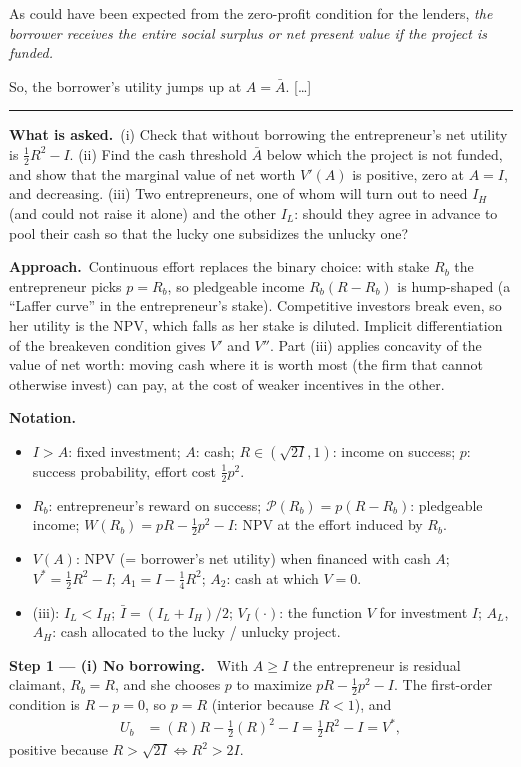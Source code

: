 \documentclass[11pt,a4paper]{article}
\newcommand{\notation}{\par\noindent\textbf{Notation.}}
\newcommand{\step}[2]{\par\medskip\noindent\textbf{Step #1 --- #2.}~}
\newcommand{\asked}{\par\medskip\noindent\textbf{What is asked.}~}
\newcommand{\approach}{\par\smallskip\noindent\textbf{Approach.}~}
\newcommand{\stmtend}{\par\endgroup\nopagebreak\noindent\rule{\linewidth}{0.4pt}\par\medskip}
\begin{document}
As could have been expected from the zero-profit condition for the lenders, \emph{the borrower
receives the entire social surplus or net present value if the project is funded.}

So, the borrower's utility jumps up at \(A = \bar A\). {[}\ldots{]}
\stmtend

\asked (i) Check that without borrowing the entrepreneur's net utility is $\tfrac12R^2-I$. (ii)
Find the cash threshold $\bar A$ below which the project is not funded, and show that the
marginal value of net worth $V'(A)$ is positive, zero at $A=I$, and decreasing. (iii) Two
entrepreneurs, one of whom will turn out to need $I_H$ (and could not raise it alone) and the
other $I_L$: should they agree in advance to pool their cash so that the lucky one subsidizes
the unlucky one?

\approach Continuous effort replaces the binary choice: with stake $R_b$ the entrepreneur picks
$p=R_b$, so pledgeable income $R_b(R-R_b)$ is hump-shaped (a ``Laffer curve'' in the
entrepreneur's stake). Competitive investors break even, so her utility is the NPV, which falls as
her stake is diluted. Implicit differentiation of the breakeven condition gives $V'$ and $V''$.
Part (iii) applies concavity of the value of net worth: moving cash where it is worth most
(the firm that cannot otherwise invest) can pay, at the cost of weaker incentives in the other.

\notation
\begin{itemize}
  \item $I>A$: fixed investment; $A$: cash; $R\in(\sqrt{2I},1)$: income on success; $p$: success probability, effort cost $\tfrac12p^2$.
  \item $R_b$: entrepreneur's reward on success; $\mathcal P(R_b)=p(R-R_b)$: pledgeable income; $W(R_b)=pR-\tfrac12p^2-I$: NPV at the effort induced by $R_b$.
  \item $V(A)$: NPV (= borrower's net utility) when financed with cash $A$; $V^*=\tfrac12R^2-I$; $A_1=I-\tfrac14R^2$; $A_2$: cash at which $V=0$.
  \item (iii): $I_L<I_H$; $\bar I=(I_L+I_H)/2$; $V_I(\cdot)$: the function $V$ for investment $I$; $A_L$, $A_H$: cash allocated to the lucky / unlucky project.
\end{itemize}

\step{1}{(i) No borrowing} With $A\ge I$ the entrepreneur is residual claimant, $R_b=R$, and she
chooses $p$ to maximize $pR-\tfrac12p^2-I$. The first-order condition is $R-p=0$, so $p=R$
(interior because $R<1$), and
\begin{align}
  U_b &= (R)R-\tfrac12(R)^2-I = \tfrac12R^2-I = V^*, \nonumber
\end{align}
positive because $R>\sqrt{2I}\iff R^2>2I$.
\end{document}
